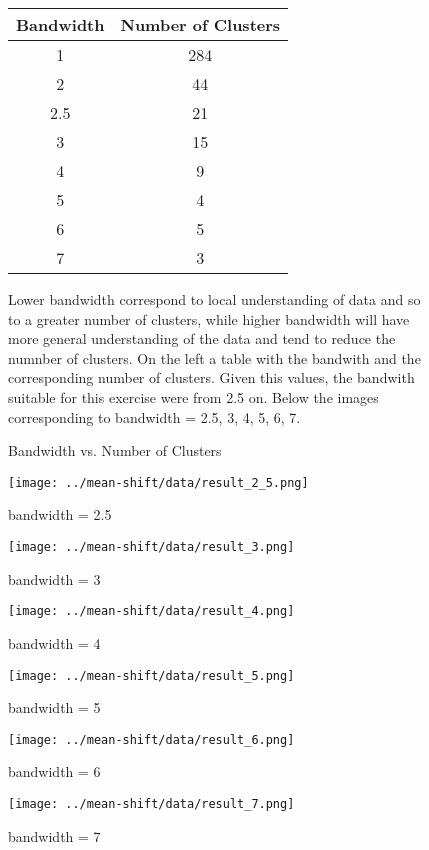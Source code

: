 \documentclass{ETHExercise}
\begin{document}
\begin{figure}[htbp]
  \begin{minipage}[t]{0.6\textwidth}
    \centering
    \begin{tabular}{|c|c|}
      \hline
      \textbf{Bandwidth} & \textbf{Number of Clusters} \\
      \hline
      1 & 284 \\
      2 & 44 \\
      2.5 & 21 \\
      3 & 15 \\
      4 & 9 \\
      5 & 4 \\
      6 & 5 \\
      7 & 3 \\
      \hline
    \end{tabular}
    \caption{Bandwidth vs. Number of Clusters}
    \label{tab:bandwidth_clusters}
  \end{minipage}%
  \hfill
  \begin{minipage}{0.4\textwidth}
    Lower bandwidth correspond to local understanding of data and so to a greater number of clusters, 
    while higher bandwidth will have more general understanding of the data and tend to reduce the numnber of 
    clusters. On the left a table with the bandwith and the corresponding number of clusters. 
    Given this values, the bandwith suitable for this exercise were from 2.5 on.
    Below the images corresponding to bandwidth = 2.5, 3, 4, 5, 6, 7. \end{minipage}
\end{figure}


\begin{figure}[!h]
    \texttt{[image: ../mean-shift/data/result\_2\_5.png]}
  \caption{bandwidth = 2.5}
  \endminipage\space
    \texttt{[image: ../mean-shift/data/result\_3.png]}
    \caption{bandwidth = 3}
  \endminipage\space
    \texttt{[image: ../mean-shift/data/result\_4.png]}
    \caption{bandwidth = 4}
  \endminipage\space
    \texttt{[image: ../mean-shift/data/result\_5.png]}
    \caption{bandwidth = 5}
  \endminipage\hfill
    \texttt{[image: ../mean-shift/data/result\_6.png]}
    \caption{bandwidth = 6}
  \endminipage\hfill
    \texttt{[image: ../mean-shift/data/result\_7.png]}
    \caption{bandwidth = 7}
  \endminipage
  \end{figure}
\end{document}
